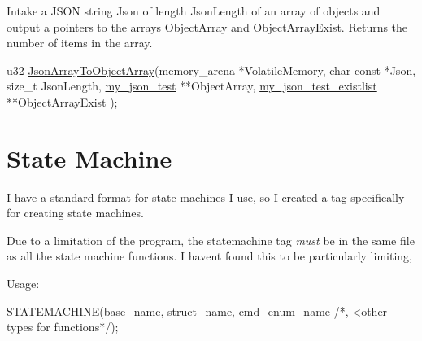 Intake a J\+S\+ON string {\ttfamily Json} of length {\ttfamily Json\+Length} of an array of objects and output a pointers to the arrays {\ttfamily Object\+Array} and {\ttfamily Object\+Array\+Exist}. Returns the number of items in the array. 
\begin{DoxyCode}
u32
\hyperlink{Generated__Test_8h_a7f44ecb93f784751376b9bf5354d69f0}{JsonArrayToObjectArray}(memory\_arena *VolatileMemory, \textcolor{keywordtype}{char} \textcolor{keyword}{const} *Json, \textcolor{keywordtype}{size\_t} 
      JsonLength, \hyperlink{structmy__json__test}{my\_json\_test} **ObjectArray, \hyperlink{structmy__json__test__existlist}{my\_json\_test\_existlist} **ObjectArrayExist
      );
\end{DoxyCode}
\hypertarget{index_autotoc_md14}{}\section{State Machine}\label{index_autotoc_md14}
I have a standard format for state machines I use, so I created a tag specifically for creating state machines.

Due to a limitation of the program, the statemachine tag {\itshape must} be in the same file as all the state machine functions. I haven\textquotesingle{}t found this to be particularly limiting,

Usage\+: 
\begin{DoxyCode}
\hyperlink{PreprocTest_8cpp_a47061d27749d7e9de66e4e834ab28848}{STATEMACHINE}(base\_name, struct\_name, cmd\_enum\_name \textcolor{comment}{/*, <other types for functions*/});
\end{DoxyCode}



